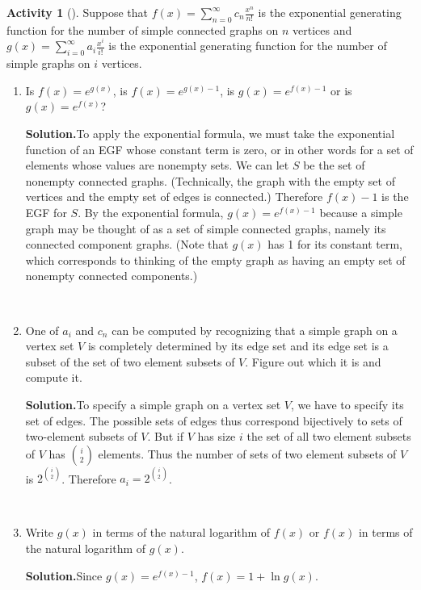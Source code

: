 \documentclass[10pt,]{book}
\theoremstyle{plain}
\theoremstyle{definition}
\newtheorem{activity}[project]{Activity}
\numberwithin{equation}{chapter}
\begin{document}
\begin{activity}[]\label{activity-395}
Suppose that \(f(x) = \sum_{n=0}^\infty c_n \frac{x^n}{n!}\) is the exponential generating function for the number of simple connected graphs on \(n\) vertices and \(g(x) = \sum_{i=0}^\infty a_i \frac{x^i}{i!}\) is the exponential generating function for the number of simple graphs on \(i\) vertices.%
~\par
\begin{enumerate}[label=(\alph*)]
 \item Is \(f(x) = e^{g(x)}\), is \(f(x) = e^{g(x)-1}\), is \(g(x) = e^{f(x)-1}\) or is \(g(x) = e^{f(x)}\)?%
\par\medskip\noindent%
\textbf{Solution.}\quad To apply the exponential formula, we must take the exponential function of an EGF whose constant term is zero, or in other words for a set of elements whose values are nonempty sets. We can let \(S\) be the set of nonempty connected graphs. (Technically, the graph with the empty set of vertices and the empty set of edges is connected.) Therefore \(f(x) -1\) is the EGF for \(S\). By the exponential formula, \(g(x)=e^{f(x)-1}\) because a simple graph may be thought of as a set of simple connected graphs, namely its connected component graphs. (Note that \(g(x)\) has 1 for its constant term, which corresponds to thinking of the empty graph as having an empty set of nonempty connected components.)%

~\par
\item One of \(a_i\) and \(c_n\) can be computed by recognizing that a simple graph on a vertex set \(V\) is completely determined by its edge set and its edge set is a subset of the set of two element subsets of \(V\). Figure out which it is and compute it.%
\par\medskip\noindent%
\textbf{Solution.}\quad To specify a simple graph on a vertex set \(V\), we have to specify its set of edges. The possible sets of edges thus correspond bijectively to sets of two-element subsets of \(V\). But if \(V\) has size \(i\) the set of all two element subsets of \(V\) has \(\binom{i}{2}\) elements. Thus the number of sets of two element subsets of \(V\) is \(2^{\binom{i}{2}}\). Therefore \(a_i = 2^{\binom{i}{2}}\).%

~\par
\item Write \(g(x)\) in terms of the natural logarithm of \(f(x)\) or \(f(x)\) in terms of the natural logarithm of  \(g(x)\).%
\par\medskip\noindent%
\textbf{Solution.}\quad Since \(g(x) = e^{f(x)-1}\), \(f(x) = 1+ \ln g(x)\).%


\end{enumerate}
\end{activity}
\end{document}
